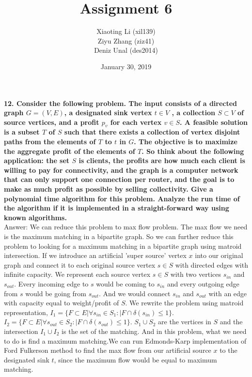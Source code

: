 \documentclass{article}
\title{Assignment 6}
\author{Xiaoting Li (xil139) \\
Ziyu Zhang (ziz41) \\
Deniz Unal (des2014)}
\date{January 30, 2019}
\begin{document}
\maketitle

\noindent
\textbf{12. Consider the following problem. The input consists of a directed graph $G = (V, E)$, a designated sink vertex $t \in V$ , a collection $S \subset V$ of source vertices, and a profit $p_v$ for each vertex $v \in S$. A feasible solution is a subset $T$ of $S$ such that there exists a collection of vertex disjoint paths from the elements of $T$ to $t$ in $G$. The objective is to maximize the aggregate profit of the elements of $T$. So think about the following application: the set $S$ is clients, the profits are how much each client is willing to pay for connectivity, and the graph is a computer network that can only support one connection per router, and the goal is to make as much profit as possible by selling collectivity. Give a polynomial time algorithm for this problem. Analyze the run time of the algorithm if it is implemented in a straight-forward way using known algorithms.} \\ \newline
\noindent
Answer: We can reduce this problem to max flow problem. The max flow we need is the maximum matching in a bipartite graph. So we can further reduce this problem to looking for a maximum matching in a bipartite graph using matroid intersection. If we introduce an artificial 'super source' vertex $x$ into our original graph and connect it to each original source vertex $s \in S$ with  directed edges with infinite capacity. We represent each source vertex $s \in S$ with two vertices $s_{in}$ and $s_{out}$. Every incoming edge to $s$ would be coming to $s_{in}$  and every outgoing edge from $s$ would be going from $s_{out}$. And we would connect $s_{in}$ and $s_{out}$ with an edge with capacity equal to weight/profit of $S$. We rewrite the problem using matroid representation, $I_{1} = \{F\subset E | \forall s_{in} \in S_1: |F \cap \delta(s_{in})\leq 1\}$. $I_{2} = \{F\subset E | \forall s_{out} \in S_2: |F \cap \delta(s_{out})\leq 1\}$. $S_1\cup S_2$ are the vertices in $S$ and the intersection $I_{1}\cup I_{2}$ is the set of the matching. And in this problem, what we need to do is find a maximum matching.We can run Edmonds-Karp implementation of Ford Fulkerson method to find the max flow from our artificial source $x$ to the designated sink $t$, since the maximum flow would be equal to maximum matching.
\end{document}
